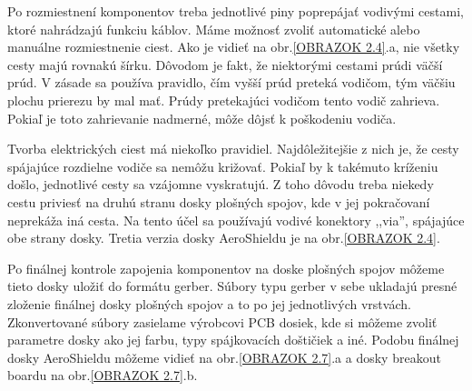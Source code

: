 Po rozmiestnení komponentov treba jednotlivé piny poprepájať vodivými cestami, ktoré nahrádzajú funkciu káblov. Máme možnosť zvoliť automatické alebo manuálne rozmiestnenie ciest. Ako je vidieť na obr.\ref{OBRAZOK 2.4}.a, nie všetky cesty majú rovnakú šírku. Dôvodom je fakt, že niektorými cestami prúdi väčší prúd. V zásade sa používa pravidlo, čím vyšší prúd preteká vodičom, tým väčšiu plochu prierezu by mal mať. Prúdy pretekajúci vodičom tento vodič zahrieva. Pokiaľ je toto zahrievanie nadmerné, môže dôjsť k poškodeniu vodiča.  

Tvorba elektrických ciest má niekoľko pravidiel. Najdôležitejšie z nich je, že cesty spájajúce rozdielne vodiče sa nemôžu križovať. Pokiaľ by k takémuto kríženiu došlo, jednotlivé cesty sa vzájomne vyskratujú. Z toho dôvodu treba niekedy cestu priviesť na druhú stranu dosky plošných spojov, kde v jej pokračovaní neprekáža iná cesta. Na tento účel sa používajú vodivé konektory ,,via'', spájajúce obe strany dosky. Tretia verzia dosky AeroShieldu je na obr.\ref{OBRAZOK 2.4}. 

Po finálnej kontrole zapojenia komponentov na doske plošných spojov môžeme tieto dosky uložiť do formátu gerber. Súbory typu gerber v sebe ukladajú presné zloženie finálnej dosky plošných spojov a to po jej jednotlivých vrstvách. Zkonvertované súbory zasielame výrobcovi PCB dosiek, kde si môžeme zvoliť parametre dosky ako jej farbu, typy spájkovacích doštičiek a iné. Podobu finálnej dosky AeroShieldu môžeme vidieť na obr.\ref{OBRAZOK 2.7}.a a dosky breakout boardu na obr.\ref{OBRAZOK 2.7}.b.

